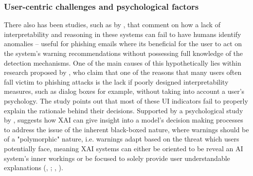 
\subsubsection*{User-centric challenges and psychological factors}
There also has been studies, such as by \cite{vo2024securing}, that comment on how a lack of interpretability and reasoning in these systems can fail to have humans identify anomalies -- useful for phishing emails where its beneficial for the user to act on the system's warning recommendations without possessing full knowledge of the detection mechanisms. One of the main causes of this hypothetically lies within research proposed by \cite{greco2023explaining}, who claim that one of the reasons that many users often fall victim to phishing attacks is the lack if poorly designed interpretability measures, such as dialog boxes for example, without taking into account a user's psychology. The study points out that most of these UI indicators fail to properly explain the rationale behind their decisions. Supported by a psychological study by \cite{anderson2015polymorphic}, suggests how XAI can give insight into a model's decision making processes to address the issue of the inherent black-boxed nature, where warnings should be of a "polymorphic" nature, i.e. warnings adapt based on the threat which users potentially face, meaning XAI systems can either be oriented to be reveal an AI system's inner workings or be focused to solely provide user understandable explanations (\citeauthor{lipton2018mythos}, \citeyear{lipton2018mythos}; \citeauthor{ribeiro2016model}, \citeyear{ribeiro2016model}).
